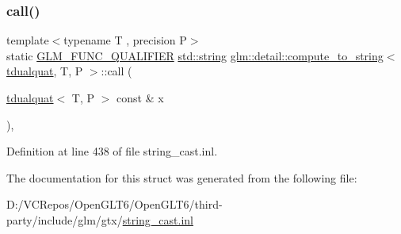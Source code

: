 \subsubsection{\texorpdfstring{call()}{call()}}
{\footnotesize\ttfamily template$<$typename T , precision P$>$ \\
static \mbox{\hyperlink{setup_8hpp_a33fdea6f91c5f834105f7415e2a64407}{G\+L\+M\+\_\+\+F\+U\+N\+C\+\_\+\+Q\+U\+A\+L\+I\+F\+I\+ER}} \mbox{\hyperlink{glad_8h_ac83513893df92266f79a515488701770}{std\+::string}} \mbox{\hyperlink{structglm_1_1detail_1_1compute__to__string}{glm\+::detail\+::compute\+\_\+to\+\_\+string}}$<$ \mbox{\hyperlink{structglm_1_1tdualquat}{tdualquat}}, T, P $>$\+::call (\begin{DoxyParamCaption}\item[{\mbox{\hyperlink{structglm_1_1tdualquat}{tdualquat}}$<$ T, P $>$ const \&}]{x }\end{DoxyParamCaption})\hspace{0.3cm}{\ttfamily [inline]}, {\ttfamily [static]}}



Definition at line 438 of file string\+\_\+cast.\+inl.



The documentation for this struct was generated from the following file\+:\begin{DoxyCompactItemize}
\item 
D\+:/\+V\+C\+Repos/\+Open\+G\+L\+T6/\+Open\+G\+L\+T6/third-\/party/include/glm/gtx/\mbox{\hyperlink{string__cast_8inl}{string\+\_\+cast.\+inl}}\end{DoxyCompactItemize}
